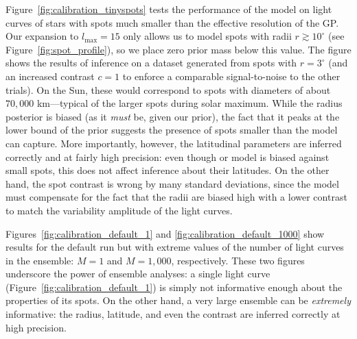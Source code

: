 \documentclass[modern,linenumbers]{aastex62}
\begin{document}
Figure~\ref{fig:calibration_tinyspots} tests the performance of the model
on light curves of stars with spots much smaller than the effective resolution
of the GP. Our expansion to $l_\mathrm{max} = 15$ only allows us to model spots
with radii $r \gtrsim 10^\circ$ (see Figure~\ref{fig:spot_profile}), so we
place zero prior mass below this value. The figure shows the results of inference
on a dataset generated from spots with $r = 3^\circ$ (and an increased
contrast $c = 1$ to enforce a comparable signal-to-noise to the other trials).
On the Sun, these would correspond to spots with diameters of about
$70{,}000$ km---typical of the larger spots during solar maximum.
While the radius posterior is biased (as it \emph{must} be, given our prior),
the fact that it peaks at the lower bound of the prior suggests the presence
of spots smaller than the model can capture. More importantly, however, the
latitudinal parameters are inferred correctly and at fairly high precision:
even though or model is biased against small spots, this does not affect
inference about their latitudes. On the other hand, the spot contrast is wrong
by many standard deviations, since the model must compensate for the fact
that the radii are biased high with a lower contrast to match the variability
amplitude of the light curves.

Figures~\ref{fig:calibration_default_1} and \ref{fig:calibration_default_1000}
show results for the default run but with extreme values of the number of
light curves in the ensemble: $M = 1$ and $M = 1{,}000$, respectively.
These two figures underscore the power of ensemble analyses: a single light
curve (Figure~\ref{fig:calibration_default_1}) is simply not informative
enough about the properties of its spots. On the other hand, a very large
ensemble can be \emph{extremely} informative: the radius, latitude, and even
the contrast are inferred correctly at high precision.
\end{document}
